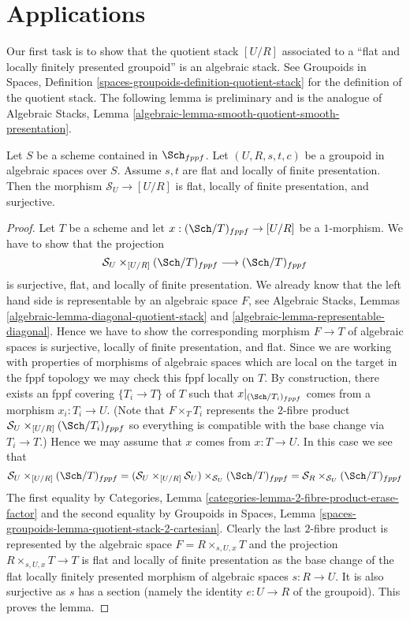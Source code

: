 \section{Applications}
\label{section-applications}

\noindent
Our first task is to show that the quotient stack $[U/R]$ associated to
a ``flat and locally finitely presented groupoid'' is an algebraic stack.
See
Groupoids in Spaces,
Definition \ref{spaces-groupoids-definition-quotient-stack}
for the definition of the quotient stack.
The following lemma is preliminary and is the analogue of
Algebraic Stacks,
Lemma \ref{algebraic-lemma-smooth-quotient-smooth-presentation}.

\begin{lemma}
\label{lemma-flat-quotient-flat-presentation}
Let $S$ be a scheme contained in $\Sch_{fppf}$.
Let $(U, R, s, t, c)$ be a groupoid in algebraic spaces over $S$.
Assume $s, t$ are flat and locally of finite presentation.
Then the morphism $\mathcal{S}_U \to [U/R]$ is flat, locally of
finite presentation, and surjective.
\end{lemma}

\begin{proof}
Let $T$ be a scheme and let $x : (\Sch/T)_{fppf} \to [U/R]$
be a $1$-morphism. We have to show that the projection
$$
\mathcal{S}_U \times_{[U/R]} (\Sch/T)_{fppf}
\longrightarrow
(\Sch/T)_{fppf}
$$
is surjective, flat, and locally of finite presentation.
We already know that the left hand side
is representable by an algebraic space $F$, see
Algebraic Stacks, Lemmas \ref{algebraic-lemma-diagonal-quotient-stack} and
\ref{algebraic-lemma-representable-diagonal}.
Hence we have to show the corresponding morphism $F \to T$ of
algebraic spaces is surjective, locally of finite presentation, and flat.
Since we are working with properties of morphisms of algebraic
spaces which are local on the target in the fppf topology we
may check this fppf locally on $T$. By construction, there exists
an fppf covering $\{T_i \to T\}$ of $T$ such that
$x|_{(\Sch/T_i)_{fppf}}$ comes from a morphism
$x_i : T_i \to U$. (Note that $F \times_T T_i$ represents the
$2$-fibre product $\mathcal{S}_U \times_{[U/R]} (\Sch/T_i)_{fppf}$
so everything is compatible with the base change via $T_i \to T$.)
Hence we may assume that $x$ comes from $x : T \to U$.
In this case we see that
$$
\mathcal{S}_U \times_{[U/R]} (\Sch/T)_{fppf}
=
(\mathcal{S}_U \times_{[U/R]} \mathcal{S}_U)
\times_{\mathcal{S}_U} (\Sch/T)_{fppf}
=
\mathcal{S}_R \times_{\mathcal{S}_U} (\Sch/T)_{fppf}
$$
The first equality by
Categories, Lemma \ref{categories-lemma-2-fibre-product-erase-factor}
and the second equality by
Groupoids in Spaces,
Lemma \ref{spaces-groupoids-lemma-quotient-stack-2-cartesian}.
Clearly the last $2$-fibre product is represented by the algebraic
space $F = R \times_{s, U, x} T$ and the projection
$R \times_{s, U, x} T \to T$ is flat and locally of finite presentation
as the base change of the flat locally finitely presented
morphism of algebraic spaces $s : R \to U$.
It is also surjective as $s$ has a section (namely the identity
$e : U \to R$ of the groupoid).
This proves the lemma.
\end{proof}

